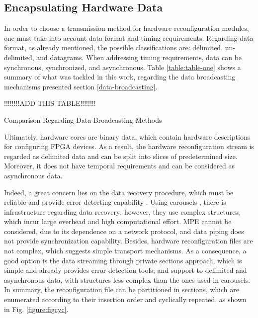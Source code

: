 \subsection{Encapsulating Hardware Data}
\label{encap-method}

In order to choose a transmission method for hardware reconfiguration modules, one must take into account data format and timing requirements. Regarding data format, as already mentioned, the possible classifications are: delimited, un-delimited, and datagrams. When addressing timing requirements, data can be synchronous, synchronized, and asynchronous. Table \ref{table:table-one} shows a summary of what was tackled in this work, regarding the data broadcasting mechanisms presented section \ref{data-broadcasting}.


\begin{table}[ht]
\renewcommand{\arraystretch}{1.18}
\footnotesize{ !!!!!!!!ADD THIS TABLE!!!!!!!! }
\caption{Comparison Regarding Data Broadcasting Methods}
\label{table:table-one}
\end{table}

Ultimately, hardware cores are binary data, which contain hardware descriptions for configuring FPGA devices. As a result, the hardware reconfiguration stream is regarded as delimited data and can be split into slices of predetermined size. Moreover, it does not have temporal requirements and can be considered as asynchronous data.
%

Indeed, a great concern lies on the data recovery procedure, which must be reliable and provide error-detecting capability \cite{ref23}. Using carousels \cite{ref20,ref21}, there is infrastructure regarding data recovery; however, they use complex structures, which incur large overhead and high computational effort. MPE cannot be considered, due to its dependence on a network protocol, and data piping does not provide synchronization capability. Besides, hardware reconfiguration files are not complex, which suggests simple transport mechanisms. As a consequence, a good option is the data streaming through private sections approach, which is simple and already provides error-detection tools; and support to delimited and asynchronous data, with structures less complex than the ones used in carousels. In summary, the reconfiguration file can be partitioned in sections, which are enumerated according to their insertion order and cyclically repeated, as shown in Fig. \ref{figure:figcyc}.

